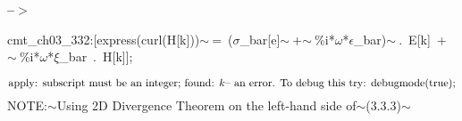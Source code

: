 \documentclass[fleqn]{article}
\begin{document}
\noindent
\begin{minipage}[t]{4.000000em}\color{red}\bfseries
 --\ensuremath{\ensuremath{>}}	
\end{minipage}
\begin{minipage}[t]{\textwidth}\color{blue}
cmt\_ch03\_332:[express(curl(H[k]))\ensuremath{\sim\ }=\ (\ensuremath{\sigma}\_bar[e]\ensuremath{\sim\ }+\ensuremath{\sim\ }\%i*\ensuremath{\omega}*\ensuremath{\epsilon}\_bar)\ensuremath{\sim\ }.\ E[k]\ +\ensuremath{\sim\ }\%i*\ensuremath{\omega}*\ensuremath{\xi}\_bar\ .\ H[k]];
\end{minipage}
\[\displaystyle \mbox{}\\\mbox{%
apply: subscript must be an integer; found: }k
\mbox{%
 -- an error. To debug this try: debugmode(true);}\mbox{}
\]
NOTE:\ensuremath{\sim }Using 2D Divergence Theorem on the left-hand side of\ensuremath{\sim }(3.3.3)\ensuremath{\sim }
\end{document}

